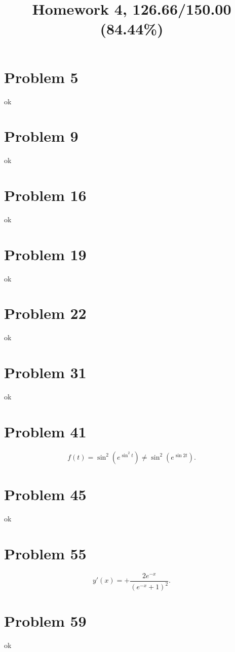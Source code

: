 \documentclass[10pt]{article} %
\title{Homework 4,
126.66/150.00 (84.44\%)
}
\begin{document}
\maketitle

\section*{Problem 5 }
ok

\section*{Problem 9 }
ok

\section*{Problem 16 }
ok

\section*{Problem 19 }
ok
\section*{Problem 22 }
ok
\section*{Problem 31 }
ok
\section*{Problem 41 }
\begin{equation*}
	f(t)=\sin^2(e^{\sin^2t})\neq\sin^2\left( e^{\sin2t} \right).
\end{equation*}
\section*{Problem 45 }
ok
\section*{Problem 55 }
\begin{equation*}
	y'(x)=+\frac{2e^{-x}}{\left( e^{-x}+1 \right)^2}.
\end{equation*}
\section*{Problem 59 }
ok
\end{document}
